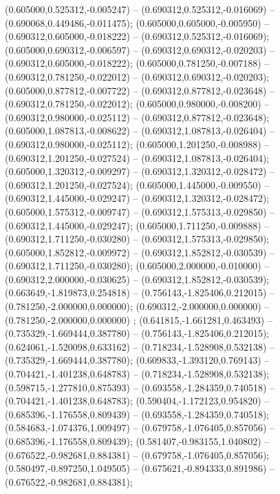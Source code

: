  (0.605000,0.525312,-0.005247) -- (0.690312,0.525312,-0.016069) -- (0.690068,0.449486,-0.011475);
 (0.605000,0.605000,-0.005950) -- (0.690312,0.605000,-0.018222) -- (0.690312,0.525312,-0.016069);
 (0.605000,0.690312,-0.006597) -- (0.690312,0.690312,-0.020203) -- (0.690312,0.605000,-0.018222);
 (0.605000,0.781250,-0.007188) -- (0.690312,0.781250,-0.022012) -- (0.690312,0.690312,-0.020203);
 (0.605000,0.877812,-0.007722) -- (0.690312,0.877812,-0.023648) -- (0.690312,0.781250,-0.022012);
 (0.605000,0.980000,-0.008200) -- (0.690312,0.980000,-0.025112) -- (0.690312,0.877812,-0.023648);
 (0.605000,1.087813,-0.008622) -- (0.690312,1.087813,-0.026404) -- (0.690312,0.980000,-0.025112);
 (0.605000,1.201250,-0.008988) -- (0.690312,1.201250,-0.027524) -- (0.690312,1.087813,-0.026404);
 (0.605000,1.320312,-0.009297) -- (0.690312,1.320312,-0.028472) -- (0.690312,1.201250,-0.027524);
 (0.605000,1.445000,-0.009550) -- (0.690312,1.445000,-0.029247) -- (0.690312,1.320312,-0.028472);
 (0.605000,1.575312,-0.009747) -- (0.690312,1.575313,-0.029850) -- (0.690312,1.445000,-0.029247);
 (0.605000,1.711250,-0.009888) -- (0.690312,1.711250,-0.030280) -- (0.690312,1.575313,-0.029850);
 (0.605000,1.852812,-0.009972) -- (0.690312,1.852812,-0.030539) -- (0.690312,1.711250,-0.030280);
 (0.605000,2.000000,-0.010000) -- (0.690312,2.000000,-0.030625) -- (0.690312,1.852812,-0.030539);
 (0.663649,-1.819873,0.254818) -- (0.756143,-1.825406,0.212015) -- (0.781250,-2.000000,0.000000);
 (0.690312,-2.000000,0.000000) -- (0.781250,-2.000000,0.000000) ;
 (0.641815,-1.661281,0.463493) -- (0.735329,-1.669444,0.387780) -- (0.756143,-1.825406,0.212015);
 (0.624061,-1.520098,0.633162) -- (0.718234,-1.528908,0.532138) -- (0.735329,-1.669444,0.387780);
 (0.609833,-1.393120,0.769143) -- (0.704421,-1.401238,0.648783) -- (0.718234,-1.528908,0.532138);
 (0.598715,-1.277810,0.875393) -- (0.693558,-1.284359,0.740518) -- (0.704421,-1.401238,0.648783);
 (0.590404,-1.172123,0.954820) -- (0.685396,-1.176558,0.809439) -- (0.693558,-1.284359,0.740518);
 (0.584683,-1.074376,1.009497) -- (0.679758,-1.076405,0.857056) -- (0.685396,-1.176558,0.809439);
 (0.581407,-0.983155,1.040802) -- (0.676522,-0.982681,0.884381) -- (0.679758,-1.076405,0.857056);
 (0.580497,-0.897250,1.049505) -- (0.675621,-0.894333,0.891986) -- (0.676522,-0.982681,0.884381);
